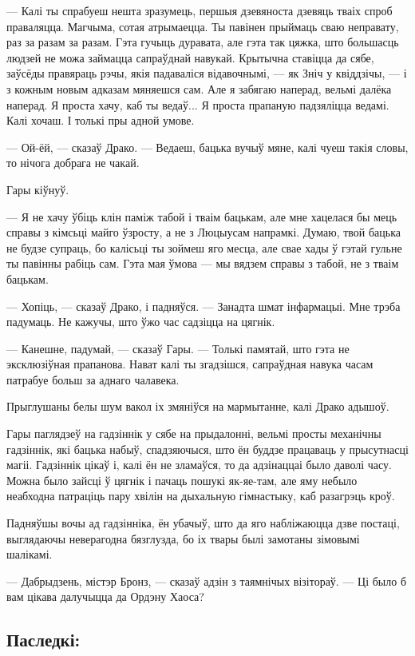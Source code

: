 --- Калі ты спрабуеш нешта зразумець, першыя дзевяноста дзевяць тваіх спроб 
праваляцца. Магчыма, сотая атрымаецца. Ты павінен прыймаць сваю неправату, 
раз за разам за разам. Гэта гучыць дуравата, але гэта так цяжка, што большасць
людзей не можа займацца сапраўднай навукай. Крытычна ставіцца да сябе, 
заўсёды правяраць рэчы, якія падаваліся відавочнымі, --- як Зніч у квіддзічы, ---
і з кожным новым адказам мяняешся сам. Але я забягаю наперад, вельмі далёка наперад.
Я проста хачу, каб ты ведаў... Я проста прапаную падзяліцца ведамі. Калі хочаш.
І толькі пры адной умове.

--- Ой-ёй, --- сказаў Драко. --- Ведаеш, бацька вучыў мяне, калі чуеш такія словы,
то нічога добрага не чакай.

Гары кіўнуў.

--- Я не хачу ўбіць клін паміж табой і тваім бацькам, але мне хацелася бы
мець справы з кімсьці майго ўзросту, а не з Люцыусам напрамкі. Думаю, твой бацька
не будзе супраць, бо калісьці ты зоймеш яго месца, але свае хады ў гэтай гульне 
ты павінны рабіць сам. Гэта мая ўмова --- мы вядзем справы з табой, не з тваім бацькам. 

--- Хопіць, --- сказаў Драко, і падняўся. --- Занадта шмат інфармацыі. Мне трэба 
падумаць. Не кажучы, што ўжо час садзіцца на цягнік.

--- Канешне, падумай, --- сказаў Гары. --- Толькі памятай, што гэта не эксклюзіўная
прапанова. Нават калі ты згадзішся, сапраўдная навука часам патрабуе больш за аднаго 
чалавека.

Прыглушаны белы шум вакол іх змяніўся на мармытанне, калі Драко адышоў.

Гары паглядзеў на гадзіннік у сябе на прыдалонні, вельмі просты механічны гадзіннік,
які бацька набыў, спадзяючыся, што ён буддзе працаваць у прысутнасці магіі.
Гадзіннік цікаў і, калі ён не зламаўся, то да адзінаццаі было даволі часу.
Можна было зайсці ў цягнік і пачаць пошукі як-яе-там, але яму небыло неабходна 
патраціць пару хвілін на дыхальную гімнастыку, каб разагрэць кроў.

Падняўшы вочы ад гадзінніка, ён убачыў, што да яго набліжаюцца дзве
постаці, выглядаючы неверагодна бязглузда, бо іх твары былі замотаны зімовымі
шалікамі.

--- Дабрыдзень, містэр Бронз, --- сказаў адзін з таямнічых візітораў. --- Ці было 
б вам цікава далучыцца да Ордэну Хаоса?


\subsection{Паследкі:}

